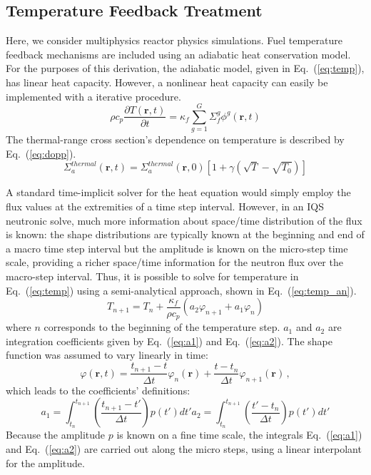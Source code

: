 \documentclass{elsarticle}
\renewcommand{\vec}[1]{\bm{#1}} %
\newcommand{\eqt}[1]{Eq.~(\ref{#1})}                     %
\newcommand{\be}{\begin{equation}}
\newcommand{\ee}{\end{equation}}
\begin{document}
\subsection{Temperature Feedback Treatment}

Here, we consider multiphysics reactor physics simulations.  Fuel temperature feedback mechanisms are included using an adiabatic heat conservation model. For the purposes of this derivation, the adiabatic model, given in \eqt{eq:temp}, has linear heat capacity. However, a nonlinear heat capacity can easily be implemented with a iterative procedure. 
\be
\rho c_p \frac{\partial T(\vec{r},t)}{\partial t} = \kappa_f \sum^G_{g=1}\Sigma_f^g \phi^g(\vec{r},t)
\label{eq:temp}
\ee
The thermal-range cross section's dependence on temperature is described by \eqt{eq:dopp}.
\be
\Sigma_a^{thermal}(\vec{r},t) = \Sigma_a^{thermal}(\vec{r},0)\left[1+\gamma\left(\sqrt{T}-\sqrt{T_0}\right)\right]
\label{eq:dopp}
\ee

A standard time-implicit solver for the heat equation would simply employ the flux values at the extremities of a time step interval.  However, in an IQS neutronic solve, much more information about space/time distribution of the flux is known: the shape distributions are typically known at the beginning and end of a macro time step interval but the amplitude is known on the micro-step time scale, providing a richer space/time information for the neutron flux over the macro-step interval. Thus, it is possible to solve for temperature in \eqt{eq:temp} using a semi-analytical approach, shown in \eqt{eq:temp_an}.
\be
T_{n+1} = T_n + \frac{\kappa_f}{\rho c_p} \left(a_2 \varphi_{n+1} + a_1 \varphi_{n}\right)
\label{eq:temp_an}
\ee
where $n$ corresponds to the beginning of the temperature step.  $a_1$ and $a_2$ are integration coefficients 
given by \eqt{eq:a1} and \eqt{eq:a2}.  The shape function was assumed to vary linearly in time:
\be
\varphi(\vec{r},t) = \frac{t_{n+1}-t}{\Delta t}\varphi_{n}(\vec{r}) + \frac{t-t_n}{\Delta t}\varphi_{n+1}(\vec{r})  \,,
\ee
which leads to the coefficients' definitions:
\begin{subequations}
\be
a_1 = \int_{t_n}^{t_{n+1}}\left(\frac{t_{n+1}-t'}{\Delta t}\right)p(t')dt'
\label{eq:a1}
\ee
\be
a_2 = \int_{t_n}^{t_{n+1}}\left(\frac{t'-t_n}{\Delta t}\right)p(t')dt'
\label{eq:a2}
\ee
\end{subequations}
Because the amplitude $p$ is known on a fine time scale, the integrals \eqt{eq:a1} and \eqt{eq:a2}
are carried out along the micro steps, using a linear interpolant for the amplitude.
\end{document}
